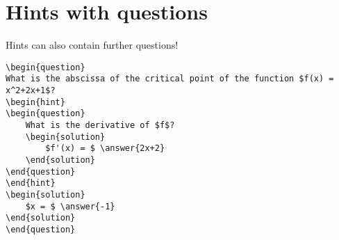 \documentclass{ximera}
\begin{document}
\section{Hints with questions}

Hints can also contain further questions! 

\begin{verbatim}
\begin{question}
What is the abscissa of the critical point of the function $f(x) = x^2+2x+1$?
\begin{hint}
\begin{question}
	What is the derivative of $f$?
	\begin{solution}
		$f'(x) = $ \answer{2x+2}
	\end{solution}
\end{question}
\end{hint}
\begin{solution}
	$x = $ \answer{-1}
\end{solution}
\end{question}
\end{verbatim}
\end{document}
